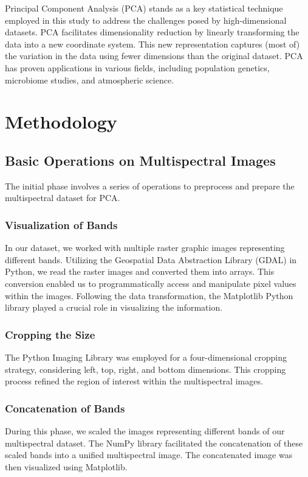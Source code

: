 \documentclass[conference]{IEEEtran}
\begin{document}
Principal Component Analysis (PCA) stands as a key statistical technique employed in this study to address the challenges posed by high-dimensional datasets. PCA facilitates dimensionality reduction by linearly transforming the data into a new coordinate system. This new representation captures (most of) the variation in the data using fewer dimensions than the original dataset. PCA has proven applications in various fields, including population genetics, microbiome studies, and atmospheric science.

\section{Methodology}
\subsection{Basic Operations on Multispectral Images}
The initial phase involves a series of operations to preprocess and prepare the multispectral dataset for PCA.

\subsubsection{Visualization of Bands}
In our dataset, we worked with multiple raster graphic images representing different bands. Utilizing the Geospatial Data Abstraction Library (GDAL) in Python, we read the raster images and converted them into arrays. This conversion enabled us to programmatically access and manipulate pixel values within the images. Following the data transformation, the Matplotlib Python library played a crucial role in visualizing the information.

\subsubsection{Cropping the Size}
The Python Imaging Library was employed for a four-dimensional cropping strategy, considering left, top, right, and bottom dimensions. This cropping process refined the region of interest within the multispectral images.

\subsubsection{Concatenation of Bands}
During this phase, we scaled the images representing different bands of our multispectral dataset. The NumPy library facilitated the concatenation of these scaled bands into a unified multispectral image. The concatenated image was then visualized using Matplotlib.
\end{document}
